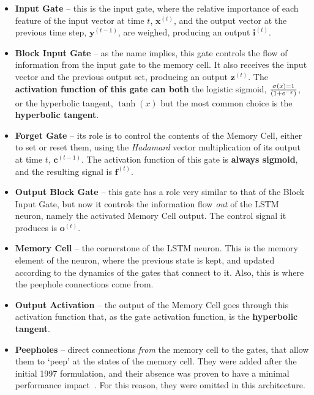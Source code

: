 \documentclass[conference]{IEEEtran}
\newcommand{\mb}[1]{\mathbf{#1}}
\begin{document}
\begin{itemize}
    \item \textbf{Input Gate} -- this is the input gate, where the relative importance of each feature of
the input vector at time $t$, $\mb{x}^{(t)}$, and the output vector at the previous time step, $\mb{y}^{(t-1)}$,
are weighed, producing an output $\mb{i}^{(t)}$.

    \item \textbf{Block Input Gate} -- as the name implies, this gate controls the flow of information
from the input gate to the memory cell. It also receives the input vector and the previous output
set, producing an output $\mb{z}^{(t)}$. The \textbf{activation function of this gate can both} the logistic
sigmoid, $\sigma(x) = 1 \over (1+e^{-x})$, or the hyperbolic tangent, $\tanh(x)$ but the most common choice is the
\textbf{hyperbolic tangent}.

    \item \textbf{Forget Gate} -- its role is to control the contents of the Memory Cell, either to
set or reset them, using the \textit{Hadamard} vector multiplication of its output at time
$t$, $\mb{c}^{(t-1)}$. The activation function of this gate is \textbf{always sigmoid}, and the resulting
signal is $\mb{f}^{(t)}$.

    \item \textbf{Output Block Gate} -- this gate has a role very similar to that of the Block Input
Gate, but now it controls the information flow \textit{out} of the LSTM neuron, namely the activated
Memory Cell output. The control signal it produces is $\mb{o}^{(t)}$.

    \item \textbf{Memory Cell} -- the cornerstone of the LSTM neuron. This is the memory element of
the neuron, where the previous state is kept, and updated according to the dynamics of the gates
that connect to it. Also, this is where the peephole connections come from.

    \item \textbf{Output Activation} -- the output of the Memory Cell goes through this activation
function that, as the gate activation function, is the \textbf{hyperbolic tangent}.

    \item \textbf{Peepholes} -- direct connections \textit{from} the memory cell to the gates, that allow them
to `peep' at the states of the memory cell. They were added after the initial 1997 formulation, and their
absence was proven to have a minimal performance impact~\cite{Greff15}. For this reason, they were omitted
in this architecture.

\end{itemize}
\end{document}

